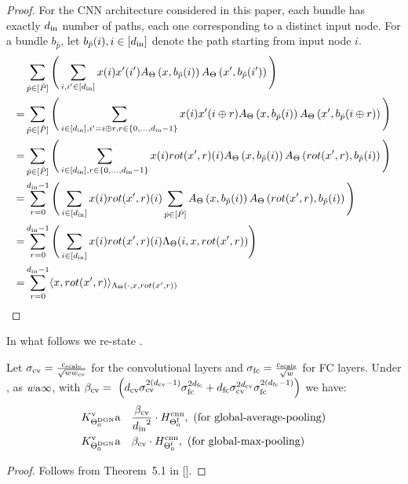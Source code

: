\begin{proof}
For the CNN architecture considered in this paper, each bundle has exactly $d_{\text{in}}$ number of paths, each one corresponding to a distinct input node. For a bundle $b_{\hat{p}}$, let $b_{\hat{p}}(i),i\in[d_{\text{in}}]$ denote the path starting from input node $i$.
\begin{align*}
&\sum_{\hat{p}\in [\hat{P}]} \Bigg(\sum_{i,i'\in[d_{\text{in}}]} x(i) x'(i') A_{\Theta}\left(x,b_{\hat{p}}(i)\right) A_{\Theta}\left(x',b_{\hat{p}}(i')\right) \Bigg)\\
=&\sum_{\hat{p}\in [\hat{P}]}\Bigg(\sum_{i\in[d_{\text{in}}],i'=i\oplus r, r\in\{0,\ldots,d_{\text{in}}-1\}} x(i) x'(i\oplus r) A_{\Theta}\left(x,b_{\hat{p}}(i)\right) A_{\Theta}\left(x',b_{\hat{p}}(i\oplus r)\right)\Bigg)\\
=&\sum_{\hat{p}\in [\hat{P}]}\Bigg(\sum_{i\in[d_{\text{in}}], r\in\{0,\ldots,d_{\text{in}}-1\}} x(i) rot(x',r)(i) A_{\Theta}\left(x,b_{\hat{p}}(i)\right) A_{\Theta}\left(rot(x',r),b_{\hat{p}}(i)\right)\Bigg)\\
=&\sum_{r=0}^{d_{\text{in}}-1} \Bigg(\sum_{i\in[d_{\text{in}}]} x(i) rot(x',r)(i) \sum_{\hat{p}\in [\hat{P}]}  A_{\Theta}\left(x,b_{\hat{p}}(i)\right) A_{\Theta}\left(rot(x',r),b_{\hat{p}}(i)\right)\Bigg)\\
=&\sum_{r=0}^{d_{\text{in}}-1}\Bigg(\sum_{i\in[d_{\text{in}}]} x(i) rot(x',r)(i) \Lambda_{\Theta}(i,x,rot(x',r))\Bigg)\\
=&\sum_{r=0}^{d_{\text{in}}-1} \langle x,rot(x',r)\rangle_{\Lambda_{\Theta}(\cdot,x,rot(x',r))}
\end{align*}
\end{proof}


In what follows we re-state .

\begin{theorem} Let $\sigma_{\text{cv}}=\frac{c_{\text{scale}}}{\sqrt{ww_{\text{cv}}}}$ for the convolutional layers and $\sigma_{\text{fc}}=\frac{c_{\text{scale}}}{\sqrt{w}}$ for FC layers. Under , as $w{\textnormal{a}}\infty$, with  $\beta_{\text{cv}} = \ \left(d_{\text{cv}} \sigma_{\text{cv}}^{2(d_{\text{cv}}-1)}\sigma_{\text{fc}}^{2d_{\text{fc}}}+d_{\text{fc}} \sigma_{\text{cv}}^{2d_{\text{cv}}}\sigma_{\text{fc}}^{2(d_{\text{fc}}-1)}\right)$ we have:
\begin{align*}
&K^{\text{v}}_{\Theta^{\text{DGN}}_0}{\textnormal{a}}\quad \frac{\beta_{\text{cv}}}{{d_{\text{in}}}^2} \cdot H^{\text{cnn}}_{\Theta^{\textrm{f}}_0},\,\,\text{(for global-average-pooling)}\\
&K^{\text{v}}_{\Theta^{\text{DGN}}_0}{\textnormal{a}} \quad{\beta_{\text{cv}}} \cdot H^{\text{cnn}}_{\Theta^{\textrm{f}}_0},\,\,\text{(for global-max-pooling)}\\
\end{align*}
\end{theorem}

\begin{proof}
Follows from Theorem~5.1 in [].
\end{proof}

